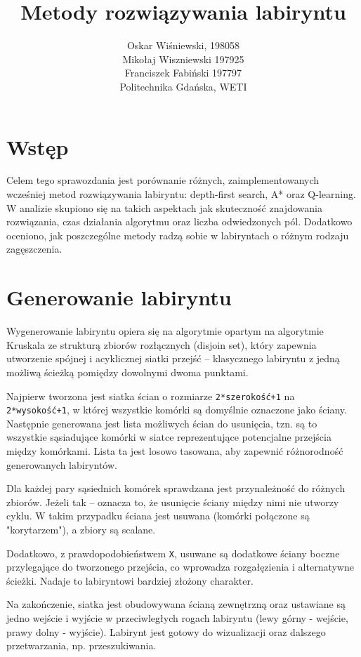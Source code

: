 \documentclass[a4paper,12pt]{article}
\title{\textbf{Metody rozwiązywania labiryntu}}
\author{Oskar Wiśniewski, 198058\\
 Mikołaj Wiszniewski 197925\\
 Franciszek Fabiński 197797 \\[0.5em]
Politechnika Gdańska, WETI}
\begin{document}
\maketitle

\section{Wstęp}
	Celem tego sprawozdania jest porównanie różnych, zaimplementowanych wcześniej metod rozwiązywania labiryntu: depth-first search, A* oraz Q-learning. W analizie skupiono się na takich aspektach jak skuteczność znajdowania rozwiązania, czas działania algorytmu oraz liczba odwiedzonych pól. Dodatkowo oceniono, jak poszczególne metody radzą sobie w labiryntach o różnym rodzaju zagęszczenia.

\section{Generowanie labiryntu}
	Wygenerowanie labiryntu opiera się na algorytmie opartym na algorytmie Kruskala ze strukturą zbiorów rozłącznych (disjoin set), który zapewnia utworzenie spójnej i acyklicznej siatki przejść – klasycznego labiryntu z jedną możliwą ścieżką pomiędzy dowolnymi dwoma punktami.
	\par Najpierw tworzona jest siatka ścian o rozmiarze \texttt{2*szerokość+1} na \texttt{2*wysokość+1}, w której wszystkie komórki są domyślnie oznaczone jako ściany. Następnie generowana jest lista możliwych ścian do usunięcia, tzn. są to wszystkie sąsiadujące komórki w siatce reprezentujące potencjalne przejścia między komórkami. Lista ta jest losowo tasowana, aby zapewnić różnorodność generowanych labiryntów.
	\par Dla każdej pary sąsiednich komórek sprawdzana jest przynależność do różnych zbiorów. Jeżeli tak – oznacza to, że usunięcie ściany między nimi nie utworzy cyklu. W takim przypadku ściana jest usuwana (komórki połączone są "korytarzem"), a zbiory są scalane.
	\par Dodatkowo, z prawdopodobieństwem \texttt{X}, usuwane są dodatkowe ściany boczne przylegające do tworzonego przejścia, co wprowadza rozgałęzienia i alternatywne ścieżki. Nadaje to labiryntowi bardziej złożony charakter.
	\par Na zakończenie, siatka jest obudowywana ścianą zewnętrzną oraz ustawiane są jedno wejście i wyjście w przeciwległych rogach labiryntu (lewy górny - wejście, prawy dolny - wyjście). Labirynt jest gotowy do wizualizacji oraz dalszego przetwarzania, np. przeszukiwania.
\end{document}

